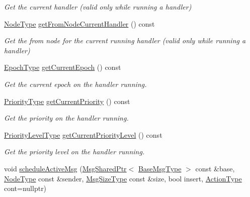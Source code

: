 \begin{DoxyCompactItemize}
\begin{DoxyCompactList}\small\item\em Get the current handler (valid only while running a handler) \end{DoxyCompactList}\item 
\hyperlink{namespacevt_a866da9d0efc19c0a1ce79e9e492f47e2}{Node\+Type} \hyperlink{structvt_1_1messaging_1_1_active_messenger_a433c49a43b304429aa2e046733dc8fde}{get\+From\+Node\+Current\+Handler} () const
\begin{DoxyCompactList}\small\item\em Get the from node for the current running handler (valid only while running a handler) \end{DoxyCompactList}\item 
\hyperlink{namespacevt_a985a5adf291c34a3ca263b3378388236}{Epoch\+Type} \hyperlink{structvt_1_1messaging_1_1_active_messenger_a5910d45e103a4c0e9c3a69084a58caac}{get\+Current\+Epoch} () const
\begin{DoxyCompactList}\small\item\em Get the current epoch on the handler running. \end{DoxyCompactList}\item 
\hyperlink{namespacevt_a86bff9f556eb761b27fc8600d006ac04}{Priority\+Type} \hyperlink{structvt_1_1messaging_1_1_active_messenger_a170f37d23b8cad11dac0de0dec556ef6}{get\+Current\+Priority} () const
\begin{DoxyCompactList}\small\item\em Get the priority on the handler running. \end{DoxyCompactList}\item 
\hyperlink{namespacevt_a53e07fdb3351b0f263e0dfd51b968d5e}{Priority\+Level\+Type} \hyperlink{structvt_1_1messaging_1_1_active_messenger_abfa87fe46bbb97786ba2dcd923da8c39}{get\+Current\+Priority\+Level} () const
\begin{DoxyCompactList}\small\item\em Get the priority level on the handler running. \end{DoxyCompactList}\item 
void \hyperlink{structvt_1_1messaging_1_1_active_messenger_a877d3a681b48e386a1fe67201181b6bd}{schedule\+Active\+Msg} (\hyperlink{structvt_1_1messaging_1_1_msg_shared_ptr}{Msg\+Shared\+Ptr}$<$ \hyperlink{namespacevt_a44d0d4e144748f2b19a1cfd962f50338}{Base\+Msg\+Type} $>$ const \&base, \hyperlink{namespacevt_a866da9d0efc19c0a1ce79e9e492f47e2}{Node\+Type} const \&sender, \hyperlink{namespacevt_a408e86a8c7c89309b52907dc5a513924}{Msg\+Size\+Type} const \&size, bool insert, \hyperlink{namespacevt_ae0a5a7b18cc99d7b732cb4d44f46b0f3}{Action\+Type} cont=nullptr)

\end{DoxyCompactItemize}
